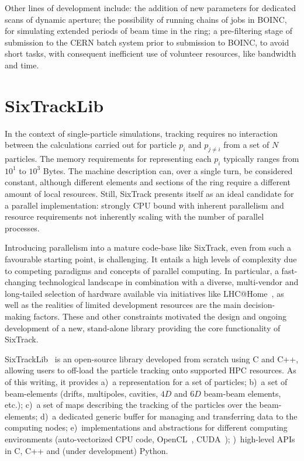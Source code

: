 \documentclass[a4paper,
              ]{jacow}
\begin{document}
Other lines of development include: the addition of new parameters for dedicated scans of dynamic aperture; the possibility of running chains of jobs in BOINC, for simulating extended periods of beam time in the ring; a pre-filtering stage of submission to the CERN batch system prior to submission to BOINC, to avoid short tasks, with consequent inefficient use of volunteer resources, like bandwidth and time.

\section{SixTrackLib}

In the context of single-particle simulations, tracking requires no interaction between the calculations carried out for particle $p_i$ and $p_{j\neq i}$ from a set of $N$ particles. The memory requirements for representing each $p_i$ typically ranges from $10^1$ to $10^3$ Bytes. The machine description can, over a single turn, be considered constant, although different elements and sections of the ring require a different amount of local resources. Still, SixTrack presents itself as an ideal candidate for a parallel implementation: strongly CPU bound with inherent parallelism and resource requirements not inherently scaling with the number of parallel processes. 

Introducing parallelism into a mature code-base like SixTrack, even from such a favourable starting point, is challenging. It entails a high levels of complexity due to competing paradigms and concepts of parallel computing. In particular, a fast-changing technological landscape in combination with a diverse, multi-vendor and long-tailed selection of hardware available via initiatives like LHC@Home~\cite{lhcathome}, as well as the realities of limited development resources are the main decision-making factors. These and other constraints motivated the design and ongoing development of a new, stand-alone library providing the core functionality of SixTrack.

SixTrackLib~\cite{sixtracklib} is an open-source library developed from scratch using C and C++, allowing users to off-load the particle tracking onto supported HPC resources. As of this writing, it provides
a)~a representation for a set of particles; b)~a set of beam-elements (drifts, multipoles, cavities, $4D$ and $6D$ beam-beam elements, etc.); c)~a set of maps describing the tracking of the particles over the beam-elements; d)~a dedicated generic buffer for managing and transferring data to the computing nodes; e)~implementations and abstractions for different computing environments (auto-vectorized CPU code, OpenCL~\cite{opencl}, CUDA~\cite{cuda}); )~high-level APIs in C, C++ and (under development) Python.
\end{document}
